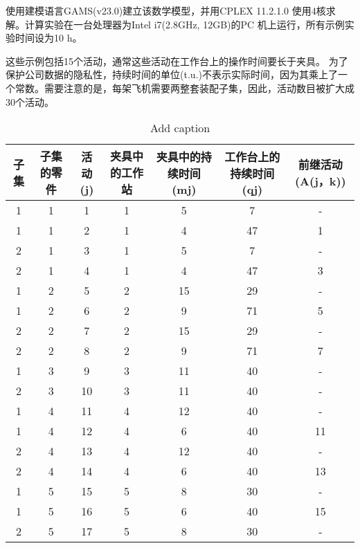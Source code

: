 使用建模语言GAMS(v23.0)建立该数学模型，并用CPLEX 11.2.1.0 使用4核求解。计算实验在一台处理器为Intel i7(2.8GHz, 12GB)的PC 机上运行，所有示例实验时间设为10 h。

这些示例包括15个活动，通常这些活动在工作台上的操作时间要长于夹具。
为了保护公司数据的隐私性，持续时间的单位(t.u.)不表示实际时间，因为其乘上了一个常数。需要注意的是，每架飞机需要两整套装配子集，因此，活动数目被扩大成30个活动。

\begin{table}[htbp]
  \centering
  \caption{Add caption}
    \begin{tabular}{ccccccc}
    \toprule

子集 &子集的零件 &活动(j) &\multicolumn{1}{m{20mm}}{夹具中的工作站} &\multicolumn{1}{m{20mm}}{夹具中的持续时间(mj)} &  \multicolumn{1}{m{20mm}}{工作台上的持续时间(qj)} &  \multicolumn{1}{m{20mm}}{前继活动(A(j，k)) }\\
\midrule
    1     & 1     & 1     & 1     & 5     & 7     & - \\
    1     & 1     & 2     & 1     & 4     & 47    & 1 \\
    2     & 1     & 3     & 1     & 5     & 7     & - \\
    2     & 1     & 4     & 1     & 4     & 47    & 3 \\
    1     & 2     & 5     & 2     & 15    & 29    & - \\
    1     & 2     & 6     & 2     & 9     & 71    & 5 \\
    2     & 2     & 7     & 2     & 15    & 29    & - \\
    2     & 2     & 8     & 2     & 9     & 71    & 7 \\
    1     & 3     & 9     & 3     & 11    & 40    & - \\
    2     & 3     & 10    & 3     & 11    & 40    & - \\
    1     & 4     & 11    & 4     & 12    & 40    & - \\
    1     & 4     & 12    & 4     & 6     & 40    & 11 \\
    2     & 4     & 13    & 4     & 12    & 40    & - \\
    2     & 4     & 14    & 4     & 6     & 40    & 13 \\
    1     & 5     & 15    & 5     & 8     & 30    & - \\
    1     & 5     & 16    & 5     & 6     & 40    & 15 \\
    2     & 5     & 17    & 5     & 8     & 30    & - \\

\end{tabular}
\end{table}
